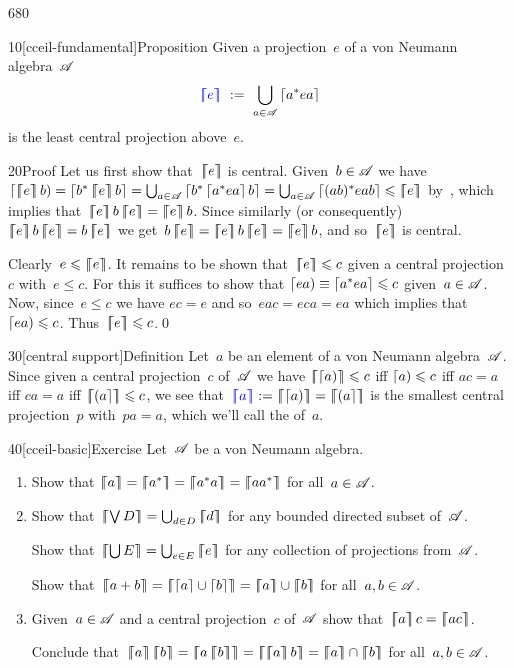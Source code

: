 \begin{parsec}{680}%
\begin{point}{10}[cceil-fundamental]{Proposition}%
Given a projection~$e$ of a von Neumann algebra~$\mathscr{A}$
\begin{equation*}
	\Define{\cceil{e}}\ :=\ 
	\bigcup_{a\in\scrA} \ceil{a^* e a}
\end{equation*}%
%
is the least central projection above~$e$.
\begin{point}{20}{Proof}%
Let us first show that~$\left\lceil\!\!\left\lceil e\right\rceil\!\!\right\rceil$ is central.
Given~$b\in\mathscr{A}$
we have $\ceill{\cceil{e}b}=\ceil{b^*\cceil{e}b}
=\bigcup_{a\in\scrA} \ceil{b^*\ceil{a^*ea}b}
= \bigcup_{a\in \scrA} \ceil{(ab)^* eab}
\leq \cceil{e}$
by~,
which implies that~$\cceil{e}b\cceil{e}=\cceil{e}b$.
Since similarly (or consequently)
$\cceil{e}b\cceil{e} = b\cceil{e}$
we get~$b\cceil{e}=\cceil{e}b\cceil{e}
=\cceil{e}b$,
and so~$\left\lceil\!\!\left\lceil e\right\rceil\!\!\right\rceil$ is central.

Clearly~$e\leqslant \left\lceil\!\!\left\lceil e\right\rceil\!\!\right\rceil$.
It remains to be shown that~$\left\lceil\!\!\left\lceil e\right\rceil\!\!\right\rceil\leqslant c$
given a central projection~$c$ with~$e\leq c$.
For this it suffices to show that $\left\lceil ea\right)\equiv \left\lceil a^*ea\right\rceil\leqslant c$
given~$a\in\mathscr{A}$.
Now, since~$e\leq c$
we have $ec=e$
and so~$eac=eca=ea$
which implies that~$\left\lceil ea\right)\leqslant c$.
Thus~$\left\lceil\!\!\left\lceil e\right\rceil\!\!\right\rceil\leqslant c$.\qed
\end{point}
\end{point}
\begin{point}{30}[central support]{Definition}%
Let~$a$ be an element of a von Neumann algebra~$\mathscr{A}$.
Since given a central projection~$c$ of~$\mathscr{A}$
we have
$\left\lceil\!\!\left\lceil\left\lceil a\right)\right\rceil\!\!\right\rceil\leqslant c$
iff $\left\lceil a\right)\leqslant c$
iff $ac=a$ 
iff
$ca=a$ iff $\left\lceil\!\!\left\lceil\left(a\right\rceil\right\rceil\!\!\right\rceil\leqslant c$,
we see that~$\Define{\cceil{a}}:=
\cceil{\ceill{a}}=\cceil{\ceilr{a}}$
is the smallest central projection~$p$
with~$p a=a$,
which we'll call the
%
	of~$a$.
\end{point}
\begin{point}{40}[cceil-basic]{Exercise}%
Let~$\mathscr{A}$ be a von Neumann algebra.
\begin{enumerate}
\item
Show that $\cceil{a}=\cceil{a^*}
=\cceil{a^*a}=\cceil{aa^*}$
for all~$a\in\mathscr{A}$.
\item
Show that~$\cceil{ \bigvee D } = \bigcup_{d\in D} \cceil{d}$
for any bounded directed subset of~$\mathscr{A}$.

Show that~$\cceil{\bigcup E} = \bigcup_{e\in E} \cceil{e}$
for any collection of projections from~$\mathscr{A}$.

Show that~$\cceil{a+b}=\cceil{\ceil{a}\cup \ceil{b}}
=\cceil{a}\cup\cceil{b}$
for all~$a,b\in \mathscr{A}$.
\item
Given~$a\in\mathscr{A}$
and a central projection~$c$ of~$\mathscr{A}$
show that~$\cceil{a}c=\cceil{ac}$.

Conclude that~$\cceil{a}\cceil{b}=\cceil{a\cceil{b}}
= \cceil{\cceil{a}b}
=\cceil{a}\cap\cceil{b}$
for all~$a,b\in\mathscr{A}$.
\end{enumerate}
\end{point}
\end{parsec}
